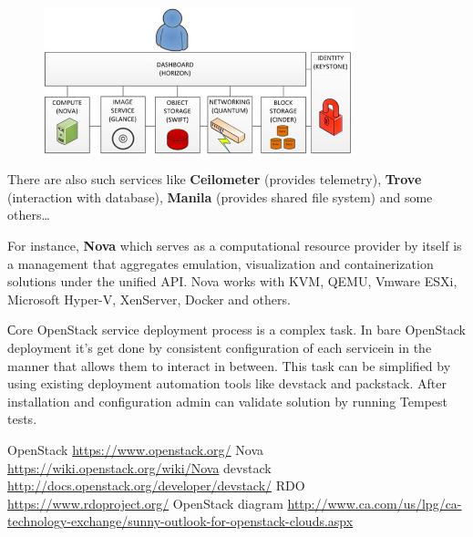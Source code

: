 \documentclass[10pt, a5paper]{article}
\begin{document}
\begin{figure}[h!]
  \centering
  \includegraphics[width=9cm]{19_2016_Perapiolkin1.png}
\end{figure}

There are also such services like \textbf{Ceilometer} (provides telemetry), \textbf{Trove} (interaction with database), \textbf{Manila} (provides shared file \linebreak system) and some others…

For instance, \textbf{Nova} which serves as a computational resource \linebreak provider by itself is a management that aggregates emulation, \linebreak visualization and containerization solutions under the unified API. Nova works with KVM, QEMU, Vmware ESXi, Microsoft Hyper-V, \linebreak XenServer, Docker and others.

Сore OpenStack service deployment process is a complex  task. In bare OpenStack deployment it’s get done by consistent configuration of each servicein in the manner that allows them to interact in between. This task can be simplified by using existing deployment automation tools like devstack and packstack. After installation and configuration admin can validate solution by running Tempest tests.

\begin{thebibliography}{9}
 OpenStack \url{https://www.openstack.org/}
 Nova \url{https://wiki.openstack.org/wiki/Nova}
 devstack \url{http://docs.openstack.org/developer/devstack/}
 RDO \url{https://www.rdoproject.org/}
 OpenStack diagram \url{http://www.ca.com/us/lpg/ca-}\linebreak\url{technology-exchange/sunny-outlook-for-openstack-clouds.aspx}
\end{thebibliography} 
\end{document}
